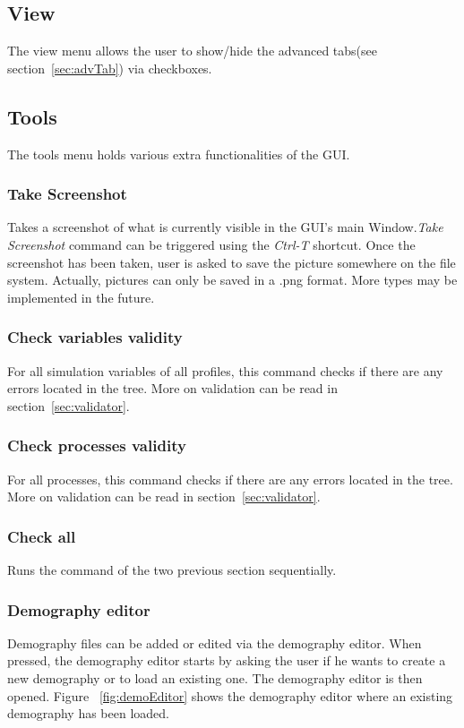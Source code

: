 \documentclass[a4paper,11pt]{report}
\begin{document}
\subsection{View}
\label{subsec:View}
The view menu allows the user to show/hide the advanced tabs(see section~\ref{sec:advTab}) via checkboxes.

\subsection{Tools}
The tools menu holds various extra functionalities of the GUI.

\subsubsection{Take Screenshot}
Takes a screenshot of what is currently visible in the GUI's main Window.\emph{Take Screenshot} command can be triggered using the \emph{Ctrl-T} shortcut. Once the screenshot has been taken, user is asked to save the picture somewhere on the file system. Actually, pictures can only be saved in a .png format. More types may be implemented in the future.

\subsubsection{Check variables validity}
For all simulation variables of all profiles, this command checks if there are any errors located in the tree. More on validation can be read in section~\ref{sec:validator}.

\subsubsection{Check processes validity}
For all processes, this command checks if there are any errors located in the tree. More on validation can be read in section~\ref{sec:validator}.

\subsubsection{Check all}
\label{subsubsec:check}
Runs the command of the two previous section sequentially.

\subsubsection{Demography editor}
Demography files can be added or edited via the demography editor. When pressed, the demography editor starts by asking the user if he wants to create a new demography or to load an existing one. The demography editor is then opened. Figure ~\ref{fig:demoEditor} shows the demography editor where an existing demography has been loaded.
\end{document}
